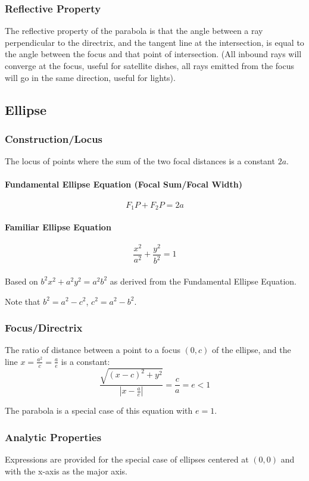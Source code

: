 \documentclass{article}
\begin{document}
\subsubsection{Reflective Property}
The reflective property of the parabola is that the angle between a ray perpendicular to the directrix, and the tangent line at the intersection, is equal to the angle between the focus and that point of intersection. (All inbound rays will converge at the focus, useful for satellite dishes, all rays emitted from the focus will go in the same direction, useful for lights).

\subsection{Ellipse}
\subsubsection{Construction/Locus}
The locus of points where the sum of the two focal distances is a constant $2a$.

\paragraph{Fundamental Ellipse Equation (Focal Sum/Focal Width)}
$$F_1P + F_2P = 2a$$

\paragraph{Familiar Ellipse Equation}
$$\frac{x^2}{a^2} + \frac{y^2}{b^2} = 1$$
\\
Based on  $b^2x^2+a^2y^2=a^2b^2$ as derived from the Fundamental Ellipse Equation.

Note that $b^2 = a^2 - c^2$, $c^2=a^2-b^2$.

\subsubsection{Focus/Directrix}
The ratio of distance between a point to a focus $(0, c)$ of the ellipse, and the line $x = \frac{a^2}{c} = \frac{a}{e}$ is a constant:
$$\frac{\sqrt{(x-c)^2+y^2}}{|x-\frac{a}{e}|} = \frac{c}{a} = e < 1$$

The parabola is a special case of this equation with $e = 1$.

\subsubsection{Analytic Properties}
Expressions are provided for the special case of ellipses centered at $(0, 0)$ and with the x-axis as the major axis.
\end{document}
